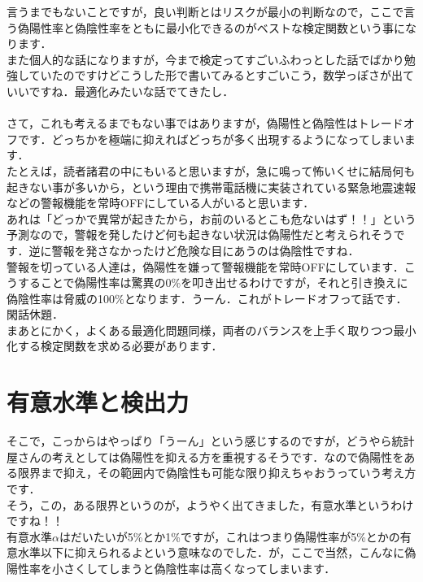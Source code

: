 \documentclass[11pt,a4paper,uplatex]{ujreport} 	%
\begin{document}
言うまでもないことですが，良い判断とはリスクが最小の判断なので，ここで言う偽陽性率と偽陰性率をともに最小化できるのがベストな検定関数という事になります．\\

また個人的な話になりますが，今まで検定ってすごいふわっとした話でばかり勉強していたのですけどこうした形で書いてみるとすごいこう，数学っぽさが出ていいですね．最適化みたいな話でてきたし．\\\\

さて，これも考えるまでもない事ではありますが，偽陽性と偽陰性はトレードオフです．どっちかを極端に抑えればどっちが多く出現するようになってしまいます．\\

たとえば，読者諸君の中にもいると思いますが，急に鳴って怖いくせに結局何も起きない事が多いから，という理由で携帯電話機に実装されている緊急地震速報などの警報機能を常時OFFにしている人がいると思います．\\

あれは「どっかで異常が起きたから，お前のいるとこも危ないはず！！」という予測なので，警報を発したけど何も起きない状況は偽陽性だと考えられそうです．逆に警報を発さなかったけど危険な目にあうのは偽陰性ですね．\\

警報を切っている人達は，偽陽性を嫌って警報機能を常時OFFにしています．こうすることで偽陽性率は驚異の0\%を叩き出せるわけですが，それと引き換えに偽陰性率は脅威の100\%となります．うーん．これがトレードオフって話です．\\

閑話休題．\\

まあとにかく，よくある最適化問題同様，両者のバランスを上手く取りつつ最小化する検定関数を求める必要があります．\\

\section{有意水準と検出力}
そこで，こっからはやっぱり「うーん」という感じするのですが，どうやら統計屋さんの考えとしては偽陽性を抑える方を重視するそうです．なので偽陽性をある限界まで抑え，その範囲内で偽陰性も可能な限り抑えちゃおうっていう考え方です．\\

そう，この，ある限界というのが，ようやく出てきました，有意水準というわけですね！！\\

有意水準$\alpha$はだいたいが5\%とか1\%ですが，これはつまり偽陽性率が5\%とかの有意水準以下に抑えられるよという意味なのでした．が，ここで当然，こんなに偽陽性率を小さくしてしまうと偽陰性率は高くなってしまいます．\\
\end{document}
